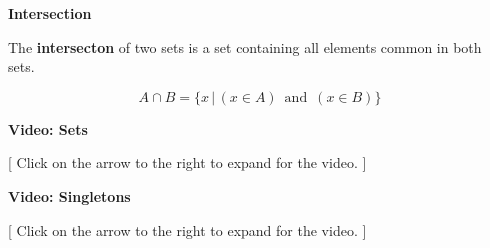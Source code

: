 \documentclass{ximera}
\begin{document}
\begin{definition} \textbf{\textcolor{green!50!black}{Intersection}}

The \textbf{intersecton} of two sets is a set containing all elements common in both sets.


\[
A \cap B = \{  x \, | \, (x \in A) \, \text{ and } \, (x \in B)  \}
\]


\end{definition}




\begin{explanation} \textbf{Video: Sets}

[ Click on the arrow to the right to expand for the video. ]
\begin{expandable} 

\begin{center}
\end{center}

\end{expandable}
\end{explanation}



\begin{explanation} \textbf{Video: Singletons}

[ Click on the arrow to the right to expand for the video. ]
\begin{expandable} 

\begin{center}
\end{center}

\end{expandable}
\end{explanation}
\end{document}

